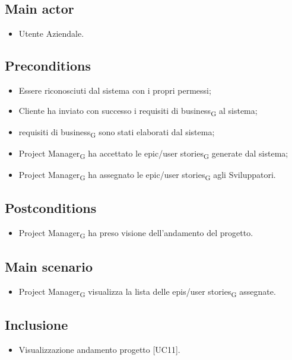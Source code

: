 \documentclass{article}
\begin{document}
    \subsection*{Main actor}
        \begin{itemize}
            \item Utente Aziendale.
        \end{itemize}
        
    \subsection*{Preconditions}
        \begin{itemize}
            \item Essere riconosciuti dal sistema con i propri permessi;
            \item Cliente ha inviato con successo i requisiti di business\textsubscript{G} al sistema;
            \item requisiti di business\textsubscript{G} sono stati elaborati dal sistema;
            \item Project Manager\textsubscript{G} ha accettato le epic/user stories\textsubscript{G} generate dal sistema;
            \item Project Manager\textsubscript{G} ha assegnato le epic/user stories\textsubscript{G} agli Sviluppatori.
        \end{itemize}
        
    \subsection*{Postconditions}
    \begin{itemize}
        \item Project Manager\textsubscript{G} ha preso visione dell'andamento del progetto.
    \end{itemize}
    
    \subsection*{Main scenario}
        \begin{itemize}
            \item Project Manager\textsubscript{G} visualizza la lista delle epis/user stories\textsubscript{G} assegnate.
        \end{itemize}
        
    \subsection*{Inclusione}
        \begin{itemize}
            \item Visualizzazione andamento progetto [UC11].
        \end{itemize}
\end{document}
